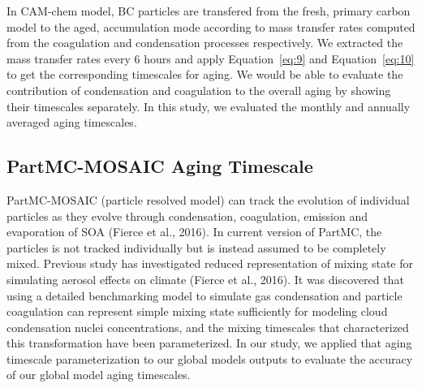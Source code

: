 \documentclass[12pt]{article}
\begin{document}
		 In CAM-chem model, BC particles are transfered from the fresh, primary carbon model to the aged, accumulation mode according to mass transfer rates computed from the coagulation and condensation processes respectively. We extracted the mass transfer rates every 6 hours and apply Equation~\ref{eq:9} and Equation~\ref{eq:10} to get the corresponding timescales for aging. We would be able to evaluate the contribution of condensation and coagulation to the overall aging by showing their  timescales separately. In this study, we evaluated the monthly and annually averaged aging timescales. 
		 
		 \subsection{PartMC-MOSAIC Aging Timescale}
		 PartMC-MOSAIC (particle resolved model) can track the evolution of individual particles as they evolve through condensation, coagulation, emission and evaporation of SOA (Fierce et al., 2016). In current version of PartMC, the particles is not tracked individually but is instead assumed to be completely mixed. Previous study has investigated reduced representation of mixing state for simulating aerosol effects on climate (Fierce et al., 2016). It was discovered that using a detailed benchmarking model to simulate gas condensation and particle coagulation can represent simple mixing state sufficiently for modeling cloud condensation nuclei concentrations, and the mixing timescales that characterized this transformation have been parameterized. In our study, we applied that aging timescale parameterization to our global models outputs to evaluate the accuracy of our global model aging timescales.
		 
\end{document}
